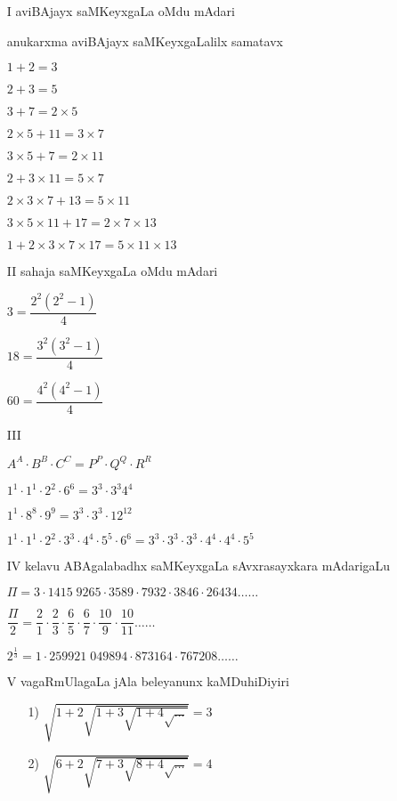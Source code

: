 \begin{enumerate}
\item[{\rm I}] aviBAjayx saMKeyxgaLa oMdu mAdari

anukarxma aviBAjayx saMKeyxgaLalilx samatavx

$1+2=3$

$2+3=5$

$3+7= 2 \times 5$

$2 \times 5+11=3 \times 7$

$3 \times 5+7= 2 \times 11$

$2+3 \times 11= 5 \times 7$

$2 \times 3 \times 7 + 13= 5 \times 11$

$3 \times 5 \times 11 + 17= 2 \times 7 \times 13$

$1+2 \times 3 \times 7 \times 17 = 5 \times 11 \times 13$

\item[{\rm II}] sahaja saMKeyxgaLa oMdu mAdari

$3= \dfrac{2^{2}(2^{2}-1)}{4}$

$18= \dfrac{3^{2}(3^{2}-1)}{4}$

$60= \dfrac{4^{2}(4^{2}-1)}{4}$

\item[{\rm III}] 

$A^{A}\cdot B^{B}\cdot C^{C}=P^{P}\cdot Q^{Q}\cdot R^{R}$

$1^{1}\cdot 1^{1}\cdot 2^{2}\cdot 6^{6}=3^{3}\cdot 3^{3}4^{4}$

$1^{1}\cdot 8^{8}\cdot 9^{9}=3^{3}\cdot 3^{3}\cdot 12^{12}$

$1^{1}\cdot 1^{1}\cdot 2^{2}\cdot 3^{3}\cdot 4^{4}\cdot 5^{5}\cdot 6^{6} = 3^{3}\cdot 3^{3}\cdot 3^{3}\cdot 4^{4}\cdot 4^{4}\cdot 5^{5}$

\item[{\rm IV}] kelavu ABAgalabadhx saMKeyxgaLa sAvxrasayxkara mAdarigaLu

$\Pi = 3\cdot 1415 \; 9265\cdot 3589\cdot 7932\cdot 3846\cdot 26434 \ldots\ldots$

$\dfrac{\Pi}{2}= \dfrac{2}{1} \cdot \dfrac{2}{3}  \cdot \dfrac{6}{5}\cdot \dfrac{6}{7}\cdot \dfrac{10}{9}\cdot \dfrac{10}{11}\ldots\ldots $

$2^{\frac{1}{3}}= 1\cdot 259921 \; 049894\cdot 873164\cdot 767208\ldots\ldots$

\item[{\rm V}] vagaRmUlagaLa jAla beleyanunx kaMDuhiDiyiri
\begin{itemize}
\item[{\rm 1)}] $\sqrt{1+2\sqrt{1+3\sqrt{1+4\sqrt{\ldots}}}} =3$
\item[{\rm 2)}] $\sqrt{6+2\sqrt{7+3\sqrt{8+4\sqrt{\ldots}}}} =4$
\end{itemize}


\end{enumerate}
